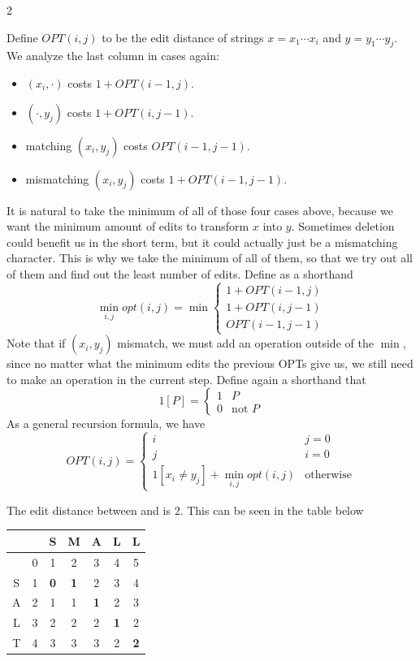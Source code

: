 \begin{multicols}{2}
\begin{analysis}
    Define $OPT(i, j)$ to be the edit distance of strings $x = x_1\cdots x_i$ and $y = y_1\cdots y_j$. We analyze the last column in cases again: 
        \begin{itemize}
        \item $(x_i, \cdot)$ costs $1 + OPT(i - 1, j)$. 
        \item $(\cdot, y_j)$ costs $1 + OPT(i, j - 1)$.
        \item matching $(x_i, y_j)$ costs $OPT(i - 1, j - 1)$.
        \item mismatching $(x_i, y_j)$ costs $1 + OPT(i - 1, j - 1)$.
    \end{itemize}
    It is natural to take the minimum of all of those four cases above, because we want the minimum amount of edits to transform $x$ into $y$. Sometimes deletion could benefit us in the short term, but it could actually just be a mismatching character. This is why we take the minimum of all of them, so that we try out all of them and find out the least number of edits. Define as a shorthand 
    $$
    \min_{i, j} opt(i,j) = \min
    \begin{cases}
        1 + OPT(i - 1, j) \\
        1 + OPT(i, j -1) \\
        OPT(i - 1, j -1)
    \end{cases} 
    $$
    Note that if $(x_i, y_j)$ mismatch, we must add an operation outside of the $\min$, since no matter what the minimum edits the previous OPTs give us, we still need to make an operation in the current step. Define again a shorthand that 
    $$
    1 [P] = 
    \begin{cases}
        1 & P \\
        0 & \textrm{not } P
    \end{cases}
    $$
    As a general recursion formula, we have 
    $$
    OPT(i, j) = 
    \begin{cases}
        i & j = 0 \\
        j & i = 0 \\
        1[x_i\neq y_j] + \min_{i,j}opt(i,j) & \textrm{otherwise}
    \end{cases}
    $$
\end{analysis}
\begin{example}
    The edit distance between  and  is $2$. This can be seen in the table below 

    \begin{center}
        
    \begin{tabular}{c|c c c c c c}
         &  & S & M & A & L & L \\
         \hline 
         & 0 & 1 & 2 & 3 & 4 & 5 \\
        S & 1 & \textbf{0} & \textbf{1} & 2 & 3 & 4 \\
        A & 2 & 1 & 1 & \textbf{1} & 2 & 3 \\
        L & 3 & 2 & 2 & 2 & \textbf{1} & 2 \\
        T & 4 & 3 & 3 & 3 & 2 & \textbf{2}
    \end{tabular}
    \end{center}


\end{example}
\end{multicols}
